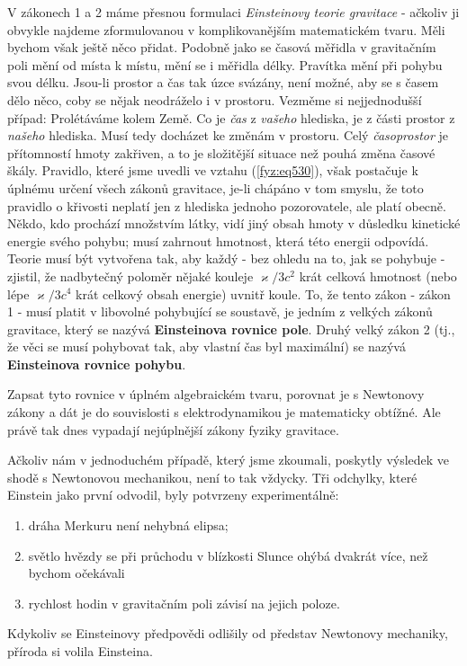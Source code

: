     V zákonech \num{1} a \num{2} máme přesnou formulaci \emph{Einsteinovy teorie gravitace} - 
    ačkoliv ji obvykle najdeme zformulovanou v komplikovanějším matematickém tvaru. Měli bychom 
    však ještě něco přidat. Podobně jako se časová měřidla v gravitačním poli mění od místa k 
    místu, mění se i měřidla délky. Pravítka mění při pohybu svou délku. Jsou-li prostor a čas tak 
    úzce svázány, není možné, aby se s časem dělo něco, coby se nějak neodráželo i v prostoru. 
    Vezměme si nejjednodušší případ: Prolétáváme kolem Země. Co je \emph{čas} z \emph{vašeho} 
    hlediska, je z části prostor z \emph{našeho} hlediska. Musí tedy docházet ke změnám v prostoru. 
    Celý \emph{časoprostor} je přítomností hmoty zakřiven, a to je složitější situace než pouhá 
    změna časové škály. Pravidlo, které jsme uvedli ve vztahu (\ref{fyz:eq530}), však postačuje k 
    úplnému určení všech zákonů gravitace, je-li chápáno v tom smyslu, že toto pravidlo o křivosti 
    neplatí jen z hlediska jednoho pozorovatele, ale platí obecně. Někdo, kdo prochází množstvím 
    látky, vidí jiný obsah hmoty v důsledku kinetické energie svého pohybu; musí zahrnout hmotnost, 
    která této energii odpovídá. Teorie musí být vytvořena tak, aby každý - bez ohledu na to, jak 
    se pohybuje - zjistil, že nadbytečný poloměr nějaké kouleje \(\varkappa/3c^2\) krát celková 
    hmotnost (nebo lépe \(\varkappa/3c^4\) krát celkový obsah energie) uvnitř koule. To, že tento 
    zákon - zákon \num{1} - musí platit v libovolné pohybující se soustavě, je jedním z velkých 
    zákonů gravitace, který se nazývá \textbf{Einsteinova rovnice pole}. Druhý velký zákon \num{2} 
    (tj., že věci se musí pohybovat tak, aby vlastní čas byl maximální) se nazývá 
    \textbf{Einsteinova rovnice pohybu}. 
    
    Zapsat tyto rovnice v úplném algebraickém tvaru, porovnat je s Newtonovy zákony a dát je do 
    souvislosti s elektrodynamikou je matematicky obtížné. Ale právě tak dnes vypadají nejúplnější 
    zákony fyziky gravitace. 
    
    Ačkoliv nám v jednoduchém případě, který jsme zkoumali, poskytly výsledek ve shodě s Newtonovou 
    mechanikou, není to tak vždycky. Tři odchylky, které Einstein jako první odvodil, byly 
    potvrzeny experimentálně: 
    \begin{enumerate}
      \item dráha Merkuru není nehybná elipsa;
      \item světlo hvězdy se při průchodu v blízkosti Slunce ohýbá dvakrát více, než bychom 
            očekávali
      \item rychlost hodin v gravitačním poli závisí na jejich poloze.
    \end{enumerate}
    Kdykoliv se Einsteinovy předpovědi odlišily od představ Newtonovy mechaniky, příroda si volila 
    Einsteina. 
    
